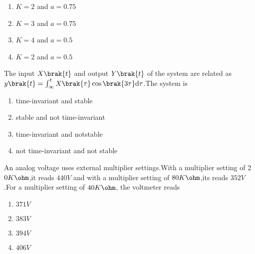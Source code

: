      \begin{enumerate}
         \item$K=2$ and $a=0.75$\\
         \item$K=3$ and $a=0.75$\\
         \item$K=4$ and $a=0.5$\\
         \item$K=2$ and $a=0.5$
          \end{enumerate}
    \item The input $X\brak{t}$ and output $Y\brak{t}$ of the system are related as $y\brak{t}=\int_\infty^tX\brak{\tau}\cos\brak{3\tau}\mathrm{d}\tau$.The system is\\
    \begin{enumerate}
        \item time-invariant and stable\\
        \item stable and not time-invariant\\
         \item time-invariant and notstable\\
        \item not time-invariant and not stable
    \end{enumerate}
    \item An analog voltage uses external multiplier settings.With a multiplier setting of 2$0 K\ohm$,it reads $440 V$ and with a multiplier setting of $80 K\ohm$,its reads $352 V$.For a multiplier setting of $40 K\ohm$, the voltmeter reads\\
    \begin{enumerate}
        \item$371 V$\\
        \item$383 V$\\
        \item$394 V$\\
        \item$406 V$
    \end{enumerate}

